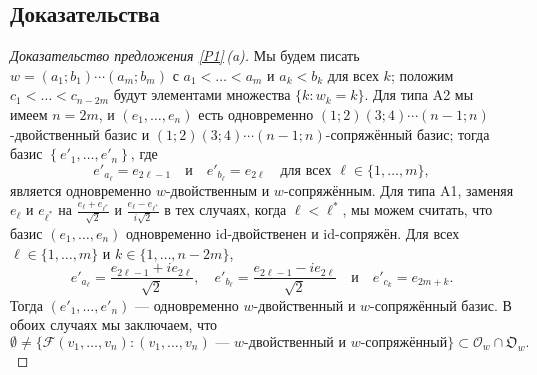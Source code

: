\documentclass{amsart}
\theoremstyle{definition}
\begin{document}
\subsection{Доказательства}

\label{S3.5}

\begin{proof}[Доказательство предложения \ref{P1}\,{\rm (a)}]
Мы будем писать $w=(a_1;b_1)\cdots(a_m;b_m)$ с $a_1<\ldots<a_m$ и
$a_k<b_k$ для всех $k$; положим $c_1<\ldots<c_{n-2m}$ будут элементами множества $\{k:w_k=k\}$.
Для типа A2 мы имеем $n=2m$, и $(e_1,\ldots,e_n)$ есть одновременно
$(1;2)(3;4)\cdots(n-1;n)$-двойственный базис и
$(1;2)(3;4)\cdots(n-1;n)$-сопряжённый базис; тогда базис
$\left\{e'_1,\ldots,e'_n\right\}$, где
\[e'_{a_\ell}=e_{2\ell-1}\quad\mbox{и}\quad e'_{b_\ell}=e_{2\ell}\quad\mbox{для всех $\ell\in\{1,\ldots,m\}$},\]
является  одновременно $w$-двойственным и $w$-сопряжённым.
Для типа A1,
заменяя $e_\ell$ и $e_{\ell^*}$ на $\frac{e_\ell+e_{\ell^*}}{\sqrt{2}}$ и $\frac{e_\ell-e_{\ell^*}}{i\sqrt{2}}$ в тех случаях, когда $\ell<\ell^*$,
мы можем считать, что
базис $(e_1,\ldots,e_n)$  одновременно $\mathrm{id}$-двойственен
и $\mathrm{id}$-сопряжён. Для всех $\ell\in\{1,\ldots,m\}$ и
$k\in\{1,\ldots,n-2m\}$,
\[e'_{a_\ell}=\frac{e_{2\ell-1}+ie_{2\ell}}{\sqrt{2}},\quad e'_{b_\ell}=\frac{e_{2\ell-1}-ie_{2\ell}}{\sqrt{2}}\quad\mbox{и}\quad e'_{c_k}=e_{2m+k}.\]
Тогда $(e'_1,\ldots,e'_n)$ --- одновременно  $w$-двойственный и
$w$-сопряжённый базис.
В обоих случаях мы заключаем, что
\begin{equation}
\label{3.1.4}
\emptyset\not=\{\mathcal{F}(v_1,\ldots,v_n):\mbox{$(v_1,\ldots,v_n)$ --- $w$-двойственный и $w$-сопряжённый}\}\subset\mathcal{O}_w\cap\mathfrak{O}_w.
\end{equation}



\end{proof}
\end{document}
